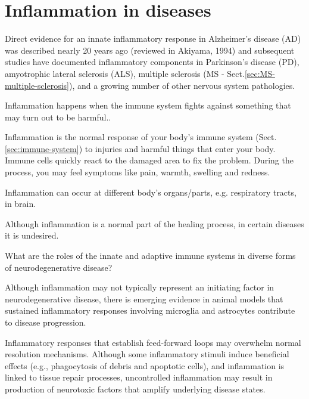  
 
\section{Inflammation in diseases}
\label{sec:inflammation-in-diseases}

Direct evidence for an innate inflammatory response in Alzheimer's disease (AD)
was described nearly 20 years ago (reviewed in Akiyama, 1994) and subsequent
studies have documented inflammatory components in Parkinson's disease (PD),
amyotrophic lateral sclerosis (ALS), multiple sclerosis (MS -
Sect.\ref{sec:MS-multiple-sclerosis}), and a growing number of other nervous
system pathologies.



\begin{mdframed}

Inflammation happens when the immune system fights against something that may
turn out to be harmful..

Inflammation is the normal response of your body's immune system
(Sect.\ref{sec:immune-system}) to injuries and harmful things that enter your
body. Immune cells quickly react to the damaged area to fix the problem. During
the process, you may feel symptoms like pain, warmth, swelling and redness.

Inflammation can occur at different body's organs/parts, e.g. respiratory tracts, in brain.

Although inflammation is a normal part of the healing process, in certain diseases it is undesired. 

\end{mdframed}

What are the roles of the innate and adaptive immune systems in diverse forms of
neurodegenerative disease?


Although inflammation may not typically represent an initiating factor in
neurodegenerative disease, there is emerging evidence in animal models that
sustained inflammatory responses involving microglia and astrocytes contribute
to disease progression.

 Inflammatory responses that establish feed-forward loops may overwhelm normal
 resolution mechanisms. Although some inflammatory stimuli induce beneficial
 effects (e.g., phagocytosis of debris and apoptotic cells), and inflammation is
 linked to tissue repair processes, uncontrolled inflammation may result in
 production of neurotoxic factors that amplify underlying disease states.

